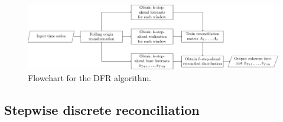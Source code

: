 \documentclass[a4paper,review,12pt,authoryear]{elsarticle}
\theoremstyle{definition}
\begin{document}
    \begin{figure}
    \centering
    \includegraphics[width=\textwidth]{figures/DFR.pdf}
    \caption{\label{fig:dfr}Flowchart for the DFR algorithm.}
    \end{figure}


    \subsection{Stepwise discrete reconciliation}
    \label{sec:algorithm2}
\end{document}
